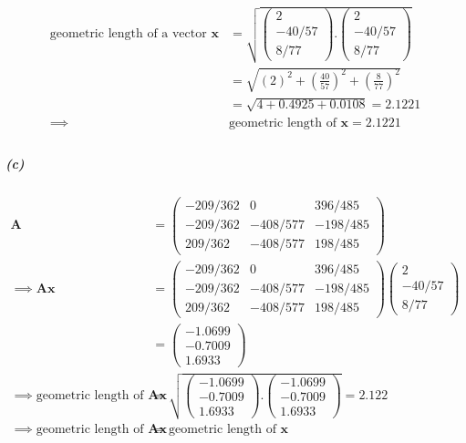 \documentclass[12pt, letterpaper]{article}
\begin{document}
\[\begin{split}
  \text{geometric length of a vector }\mathbf{x}
  &= \sqrt{\begin{pmatrix} 2\\-40/57\\8/77 \end{pmatrix}
  .\begin{pmatrix} 2\\-40/57\\8/77 \end{pmatrix}}\\
  &= \sqrt{\left(2\right)^2 + \left(\frac{40}{57}\right)^2 + \left(\frac{8}{77}\right)^2}\\
  &= \sqrt{4 + 0.4925 + 0.0108} = 2.1221\\
  \implies &\boxed{\text{geometric length of }\mathbf{x} = 2.1221}\\
\end{split} \]

\subparagraph{(c)}

\[
\begin{split}
\mathbf{A} &= \begin{pmatrix}
  -209/362 &0 &396/485\\
  -209/362 &-408/577 &-198/485\\
  209/362 &-408/577 &198/485
\end{pmatrix}\\
\implies \mathbf{Ax} &= \begin{pmatrix}
  -209/362 &0 &396/485\\
  -209/362 &-408/577 &-198/485\\
  209/362 &-408/577 &198/485
\end{pmatrix}
\begin{pmatrix} 2\\-40/57\\8/77 \end{pmatrix}\\
&= \begin{pmatrix} -1.0699\\ -0.7009\\ 1.6933 \end{pmatrix}\\
\implies \text{geometric length of }\mathbf{Ax}
&= \sqrt{\begin{pmatrix} -1.0699\\ -0.7009\\ 1.6933 \end{pmatrix}
  .\begin{pmatrix} -1.0699\\ -0.7009\\ 1.6933 \end{pmatrix}} = 2.122\\
\implies \text{geometric length of }\mathbf{Ax} &= \text{geometric length of }\mathbf{x}
\end{split}
\]
\end{document}
